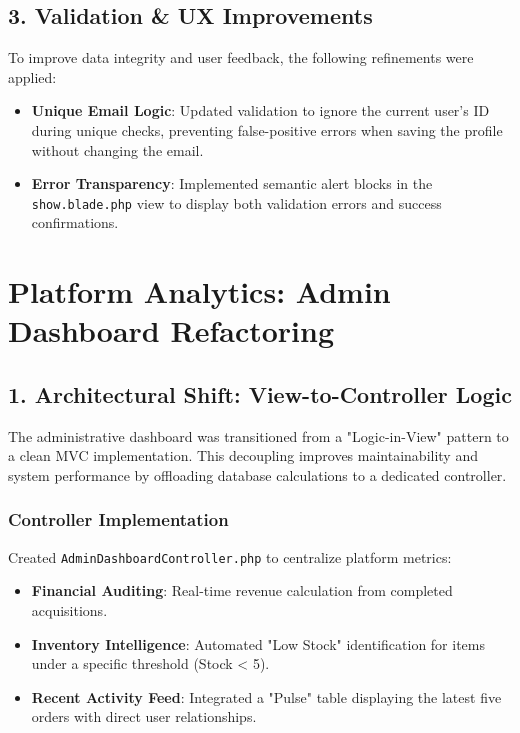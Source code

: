 \documentclass[12pt,a4paper]{article}
\begin{document}
\subsection{3. Validation \& UX Improvements}

To improve data integrity and user feedback, the following refinements were applied:

\begin{itemize}
    \item \textbf{Unique Email Logic}: Updated validation to ignore the current user's ID during unique checks, preventing false-positive errors when saving the profile without changing the email.
    \item \textbf{Error Transparency}: Implemented semantic alert blocks in the \texttt{show.blade.php} view to display both validation errors and success confirmations.
\end{itemize}

\section{Platform Analytics: Admin Dashboard Refactoring}

\subsection{1. Architectural Shift: View-to-Controller Logic}

The administrative dashboard was transitioned from a "Logic-in-View" pattern to a clean MVC implementation. This decoupling improves maintainability and system performance by offloading database calculations to a dedicated controller.

\subsubsection{Controller Implementation}
Created \texttt{AdminDashboardController.php} to centralize platform metrics:
\begin{itemize}
    \item \textbf{Financial Auditing}: Real-time revenue calculation from completed acquisitions.
    \item \textbf{Inventory Intelligence}: Automated "Low Stock" identification for items under a specific threshold (Stock < 5).
    \item \textbf{Recent Activity Feed}: Integrated a "Pulse" table displaying the latest five orders with direct user relationships.
\end{itemize}
\end{document}

